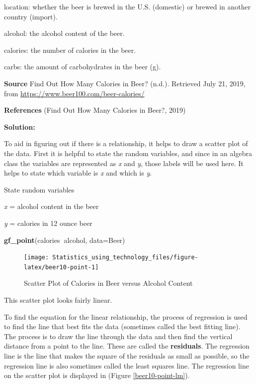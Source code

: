 \documentclass[
]{book}
\newenvironment{Shaded}{\begin{snugshade}}{\end{snugshade}}
\newcommand{\DataTypeTok}[1]{\textcolor[rgb]{0.13,0.29,0.53}{#1}}
\newcommand{\KeywordTok}[1]{\textcolor[rgb]{0.13,0.29,0.53}{\textbf{#1}}}
\newcommand{\NormalTok}[1]{#1}
\newcommand{\OperatorTok}[1]{\textcolor[rgb]{0.81,0.36,0.00}{\textbf{#1}}}
\begin{document}
location: whether the beer is brewed in the U.S. (domestic) or brewed in another country (import).

alcohol: the alcohol content of the beer.

calories: the number of calories in the beer.

carbs: the amount of carbohydrates in the beer (g).

\textbf{Source}
Find Out How Many Calories in Beer? (n.d.). Retrieved July 21, 2019, from \url{https://www.beer100.com/beer-calories/}

\textbf{References}
(Find Out How Many Calories in Beer?, 2019)

\textbf{Solution:}

To aid in figuring out if there is a relationship, it helps to draw a scatter plot of the data. First it is helpful to state the random variables, and since in an algebra class the variables are represented as \emph{x} and \emph{y}, those labels will be used here. It helps to state which variable is \emph{x} and which is \emph{y}.

State random variables

\emph{x} = alcohol content in the beer

\emph{y} = calories in 12 ounce beer



\begin{Shaded}
\begin{Highlighting}[]
\KeywordTok{gf_point}\NormalTok{(calories}\OperatorTok{~}\NormalTok{alcohol, }\DataTypeTok{data=}\NormalTok{Beer)}
\end{Highlighting}
\end{Shaded}

\begin{figure}
\texttt{[image: Statistics\_using\_technology\_files/figure-latex/beer10-point-1]} \caption{Scatter Plot of Calories in Beer versus Alcohol Content}\label{fig:beer10-point}
\end{figure}

This scatter plot looks fairly linear.

To find the equation for the linear relationship, the process of regression is used to find the line that best fits the data (sometimes called the best fitting line). The process is to draw the line through the data and then find the vertical distance from a point to the line. These are called the \textbf{residuals}. The regression line is the line that makes the square of the residuals as small as possible, so the regression line is also sometimes called the least squares line. The regression line on the scatter plot is displayed in (Figure \ref{beer10-point-lm}).
\end{document}
